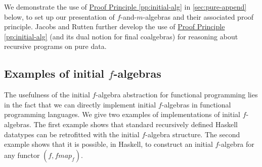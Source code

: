 \documentclass{jfp1}
\newcommand{\proofprinref}[1]{\hyperref[#1]{Proof Principle \ref*{#1}}}
\begin{document}
We demonstrate the use of \proofprinref{pp:initial-alg} in
\autoref{sec:pure-append} below, to set up our presentation of
$f$-and-$m$-algebras and their associated proof principle. Jacobs and
Rutten \cite{JacobsR11} further develop the use of
\proofprinref{pp:initial-alg} (and its dual notion for final
coalgebras) for reasoning about recursive programs on pure data.

\subsection{Examples of initial \texorpdfstring{$f$}{f}-algebras}
\label{sec:example-initial-f}

The usefulness of the initial $f$-algebra abstraction for functional
programming lies in the fact that we can directly implement initial
$f$-algebras in functional programming languages. We give two examples
of implementations of initial $f$-algebras. The first example shows
that standard recursively defined Haskell datatypes can be retrofitted
with the initial $f$-algebra structure. The second example shows that
it is possible, in Haskell, to construct an initial $f$-algebra for
any functor $(f,\mathit{fmap_f})$.
\end{document}
